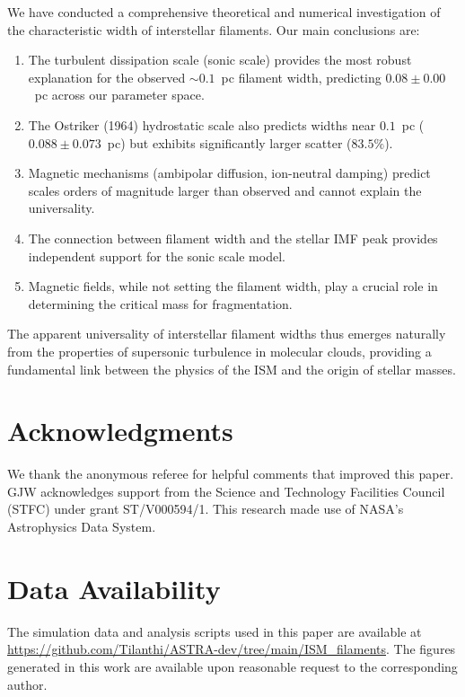 \documentclass{mnras}
\begin{document}
We have conducted a comprehensive theoretical and numerical investigation of the characteristic width of interstellar filaments. Our main conclusions are:

\begin{enumerate}
\item The turbulent dissipation scale (sonic scale) provides the most robust explanation for the observed $\sim 0.1$~pc filament width, predicting $0.08 \pm 0.00$~pc across our parameter space.
\item The Ostriker (1964) hydrostatic scale also predicts widths near $0.1$~pc ($0.088 \pm 0.073$~pc) but exhibits significantly larger scatter ($83.5\%$).
\item Magnetic mechanisms (ambipolar diffusion, ion-neutral damping) predict scales orders of magnitude larger than observed and cannot explain the universality.
\item The connection between filament width and the stellar IMF peak provides independent support for the sonic scale model.
\item Magnetic fields, while not setting the filament width, play a crucial role in determining the critical mass for fragmentation.
\end{enumerate}

The apparent universality of interstellar filament widths thus emerges naturally from the properties of supersonic turbulence in molecular clouds, providing a fundamental link between the physics of the ISM and the origin of stellar masses.


\section*{Acknowledgments}

We thank the anonymous referee for helpful comments that improved this paper. GJW acknowledges support from the Science and Technology Facilities Council (STFC) under grant ST/V000594/1. This research made use of NASA's Astrophysics Data System.


\section*{Data Availability}

The simulation data and analysis scripts used in this paper are available at \url{https://github.com/Tilanthi/ASTRA-dev/tree/main/ISM_filaments}. The figures generated in this work are available upon reasonable request to the corresponding author.




\end{document}
